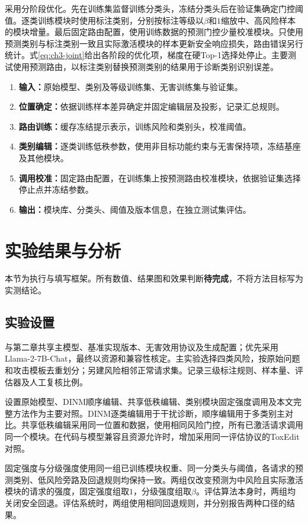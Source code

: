 采用分阶段优化。先在训练集监督训练分类头，冻结分类头后在验证集确定门控阈值。逐类训练模块时使用标注类别，分别按标注等级以$\beta$和$1$缩放中、高风险样本的模块增量。最后固定路由配置，使用训练数据的预测门控少量校准模块。只使用预测类别与标注类别一致且实际激活模块的样本更新安全响应损失，路由错误另行统计。式\eqref{eq:ch3-joint}给出各阶段的优化项，梯度在硬Top-1选择处停止。主要测试使用预测路由，以标注类别替换预测类别的结果用于诊断类别识别误差。

\begin{enumerate}
 \item \textbf{输入：}原始模型、类别及等级训练集、无害训练集与验证集。
 \item \textbf{位置确定：}依据训练样本差异确定并固定编辑层及投影，记录汇总规则。
 \item \textbf{路由训练：}缓存冻结提示表示，训练风险和类别头，校准阈值。
 \item \textbf{类别编辑：}逐类训练低秩参数，使用非目标功能约束与无害保持项，冻结基座及其他模块。
\item \textbf{调用校准：}固定路由配置，在训练集上按预测路由校准模块，依据验证集选择停止点并冻结参数。
 \item \textbf{输出：}模块库、分类头、阈值及版本信息，在独立测试集评估。
\end{enumerate}

\section{实验结果与分析}

本节为执行与填写框架。所有数值、结果图和效果判断\textbf{待完成}，不将方法目标写为实测结论。

\subsection{实验设置}

与第二章共享主模型、基准实现版本、无害效用协议及生成配置；优先采用Llama-2-7B-Chat，最终以资源和兼容性核定。主实验选择四类风险，按原始问题和攻击模板去重划分；另建风险相邻正常请求集。记录三级标注规则、样本量、评估器及人工复核比例。

设置原始模型、DINM顺序编辑、共享低秩编辑、类别模块固定强度调用及本文完整方法作为主要对照。DINM逐类编辑用于干扰诊断，顺序编辑用于多类别主对比。共享低秩编辑采用同一位置和数据，使用相同风险门控，所有已激活请求调用同一个模块。在代码与模型兼容且资源允许时，增加采用同一评估协议的ToxEdit对照。

固定强度与分级强度使用同一组已训练模块权重、同一分类头与阈值，各请求的预测类别、低风险旁路及回退规则均保持一致。两组仅改变预测为中风险且实际激活模块的请求的强度，固定强度组取$1$，分级强度组取$\beta$。评估算法本身时，两组均关闭安全回退。评估系统时，两组使用相同回退规则，并分别报告两种口径的结果。

